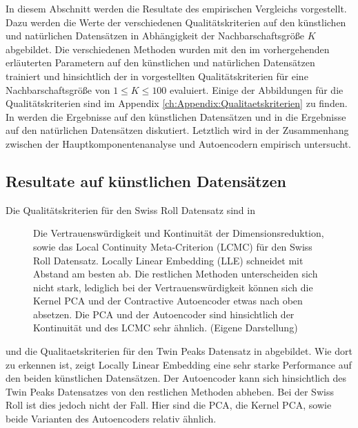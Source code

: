 In diesem Abschnitt werden die Resultate des empirischen Vergleichs vorgestellt. Dazu werden die
Werte der verschiedenen Qualitätskriterien auf den künstlichen und natürlichen Datensätzen in
Abhängigkeit der Nachbarschaftsgröße $K$ abgebildet. Die verschiedenen Methoden wurden mit den im
vorhergehenden  erläuterten Parametern auf
den künstlichen und natürlichen Datensätzen trainiert und hinsichtlich der in
 vorgestellten Qualitätskriterien für
eine Nachbarschaftsgröße von $1 \leq K \leq 100$ evaluiert. Einige der Abbildungen für die
Qualitätskriterien sind im Appendix \ref{ch:Appendix:Qualitaetskriterien} zu finden. In
 werden die Ergebnisse auf den künstlichen
Datensätzen und in  die Ergebnisse auf den
natürlichen Datensätzen diskutiert. Letztlich wird in 
der Zusammenhang zwischen der Hauptkomponentenanalyse und Autoencodern empirisch untersucht.

\subsection{Resultate auf künstlichen Datensätzen}
\label{ch:Vergleich:sec:Resultate:kuenstlich}

Die Qualitätskriterien für den Swiss Roll Datensatz sind in 
\begin{figure}[ht]
	\begin{center}
		
	\end{center}
	\caption[Qualitätskriterien für die Swiss Roll]{Die Vertrauenswürdigkeit und Kontinuität der Dimensionsreduktion, sowie das Local Continuity Meta-Criterion (LCMC) für den Swiss Roll Datensatz. Locally Linear Embedding (LLE) schneidet mit Abstand am besten ab. Die restlichen Methoden unterscheiden sich nicht stark, lediglich bei der Vertrauenswürdigkeit können sich die Kernel PCA und der Contractive Autoencoder etwas nach oben absetzen. Die PCA und der Autoencoder sind hinsichtlich der Kontinuität und des LCMC sehr ähnlich. (Eigene Darstellung)}
	\label{fig:SwissRollMetrics}
\end{figure}
und die Qualitaetskriterien für den Twin Peaks Datensatz in  abgebildet. Wie dort zu erkennen ist, zeigt Locally Linear Embedding eine sehr starke Performance auf den beiden künstlichen Datensätzen. Der Autoencoder kann sich hinsichtlich des Twin Peaks Datensatzes von den restlichen Methoden abheben. Bei der Swiss Roll ist dies jedoch nicht der Fall. Hier sind die PCA, die Kernel PCA, sowie beide Varianten des Autoencoders relativ ähnlich.

